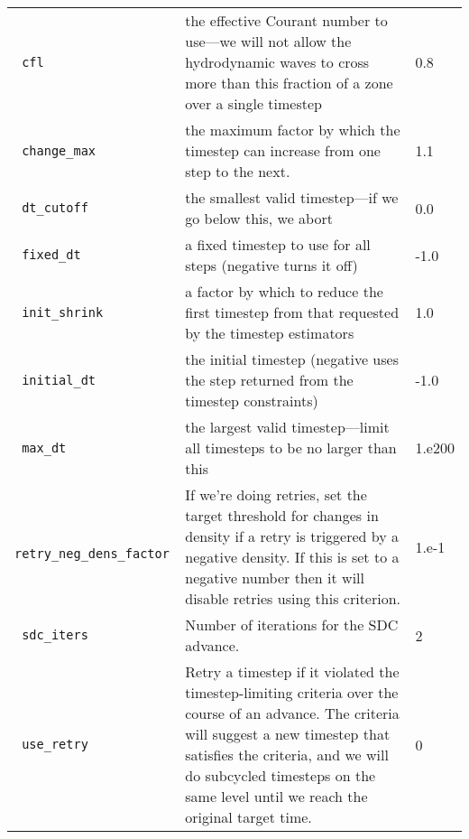 \begin{landscape}
{\begin{center}
\begin{longtable}{|l|p{5.25in}|l|}
\rowcolor{tableShade}
\verb= cfl = &  the effective Courant number to use---we will not allow the hydrodynamic waves to cross more than this fraction of a zone over a single timestep & 0.8 \\
\verb= change_max = &  the maximum factor by which the timestep can increase from one step to the next. & 1.1 \\
\rowcolor{tableShade}
\verb= dt_cutoff = &  the smallest valid timestep---if we go below this, we abort & 0.0 \\
\verb= fixed_dt = &  a fixed timestep to use for all steps (negative turns it off) & -1.0 \\
\rowcolor{tableShade}
\verb= init_shrink = &  a factor by which to reduce the first timestep from that requested by the timestep estimators & 1.0 \\
\verb= initial_dt = &  the initial timestep (negative uses the step returned from the timestep constraints) & -1.0 \\
\rowcolor{tableShade}
\verb= max_dt = &  the largest valid timestep---limit all timesteps to be no larger than this & 1.e200 \\
\verb= retry_neg_dens_factor = &  If we're doing retries, set the target threshold for changes in density if a retry is triggered by a negative density. If this is set to a negative number then it will disable retries using this criterion. & 1.e-1 \\
\rowcolor{tableShade}
\verb= sdc_iters = &  Number of iterations for the SDC advance. & 2 \\
\verb= use_retry = &  Retry a timestep if it violated the timestep-limiting criteria over the course of an advance. The criteria will suggest a new timestep that satisfies the criteria, and we will do subcycled timesteps on the same level until we reach the original target time. & 0 \\


\end{longtable}
\end{center}

} %


\end{landscape}

%


